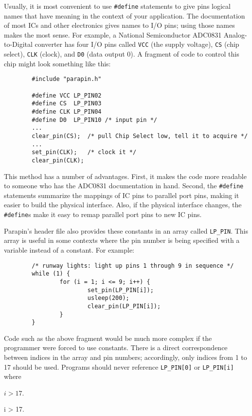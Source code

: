 \documentclass{article}
\begin{document}
Usually, it is most convenient to use {\tt \#define} statements to
give pins logical names that have meaning in the context of your
application.  The documentation of most ICs and other electronics
gives names to I/O pins; using those names makes the most sense.  For
example, a National Semiconductor ADC0831 Analog-to-Digital converter
has four I/O pins called {\tt VCC} (the supply voltage), {\tt CS}
(chip select), {\tt CLK} (clock), and {\tt D0} (data output 0).  A
fragment of code to control this chip might look something like this:
\begin{verbatim}
        #include "parapin.h"

        #define VCC LP_PIN02
        #define CS  LP_PIN03
        #define CLK LP_PIN04
        #define D0  LP_PIN10 /* input pin */
        ...
        clear_pin(CS);  /* pull Chip Select low, tell it to acquire */
        ...
        set_pin(CLK);   /* clock it */
        clear_pin(CLK);
\end{verbatim}

This method has a number of advantages.  First, it makes the code more
readable to someone who has the ADC0831 documentation in hand.
Second, the {\tt \#define} statements summarize the mappings of IC
pins to parallel port pins, making it easier to build the physical
interface.  Also, if the physical interface changes, the {\tt
\#define}s make it easy to remap parallel port pins to new IC pins.

Parapin's header file also provides these constants in an array called
{\tt LP\_PIN}.  This array is useful in some contexts where the pin
number is being specified with a variable instead of a constant.  For
example:
\begin{verbatim}
        /* runway lights: light up pins 1 through 9 in sequence */
        while (1) {
                for (i = 1; i <= 9; i++) {
                        set_pin(LP_PIN[i]);
                        usleep(200);
                        clear_pin(LP_PIN[i]);
                }
        }
\end{verbatim}

Code such as the above fragment would be much more complex if the
programmer were forced to use constants.  There is a direct
correspondence between indices in the array and pin numbers;
accordingly, only indices from 1 to 17 should be used.  Programs
should never reference \verb|LP_PIN[0]| or \verb|LP_PIN[i]| where
\begin{latexonly}$i > 17$.\end{latexonly}
\begin{htmlonly}i > 17.\end{htmlonly}
\end{document}
